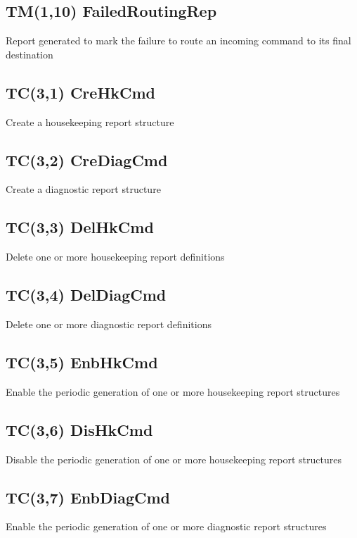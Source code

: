 \pagebreak
\subsection{TM(1,10) FailedRoutingRep}
Report generated to mark the failure to route an incoming command to its final destination

\pagebreak
\subsection{TC(3,1) CreHkCmd}
Create a housekeeping report structure

\pagebreak
\subsection{TC(3,2) CreDiagCmd}
Create a diagnostic report structure

\pagebreak
\subsection{TC(3,3) DelHkCmd}
Delete one or more housekeeping report definitions

\pagebreak
\subsection{TC(3,4) DelDiagCmd}
Delete one or more diagnostic report definitions

\pagebreak
\subsection{TC(3,5) EnbHkCmd}
Enable the periodic generation of one or more housekeeping report structures

\pagebreak
\subsection{TC(3,6) DisHkCmd}
Disable the periodic generation of one or more housekeeping report structures

\pagebreak
\subsection{TC(3,7) EnbDiagCmd}
Enable the periodic generation of one or more diagnostic report structures


